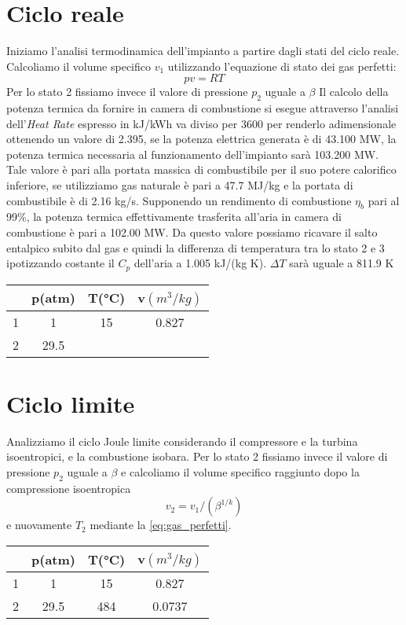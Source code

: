 \documentclass[a4paper,12pt]{article}
\begin{document}
\section{Ciclo reale}
\label{sec:ciclo_reale}
Iniziamo l'analisi termodinamica dell'impianto a partire dagli stati del ciclo reale.
Calcoliamo il volume specifico $v_1$ utilizzando l'equazione di stato dei gas perfetti:
\begin{equation}
    \label{eq:gas_perfetti}
    pv = RT
\end{equation}
Per lo stato 2 fissiamo invece il valore di pressione $p_2$ uguale a $\beta$
Il calcolo della potenza termica da fornire in camera di combustione si esegue attraverso l'analisi dell'\textit{Heat Rate} espresso in kJ/kWh va diviso per 3600 per renderlo
adimensionale ottenendo un valore di 2.395, se la potenza elettrica generata è di 43.100 MW, la potenza termica necessaria al funzionamento dell'impianto sarà 103.200 MW.
Tale valore è pari alla portata massica di combustibile per il suo potere calorifico inferiore, se utilizziamo gas naturale è pari a 47.7 MJ/kg e la portata di combustibile
è di 2.16 kg/s.
Supponendo un rendimento di combustione $\eta_b$ pari al 99\%, la potenza termica effettivamente trasferita all'aria in camera di combustione è pari a
102.00 MW. Da questo valore possiamo ricavare il salto entalpico subito dal gas e quindi la differenza di temperatura tra lo stato 2 e 3 ipotizzando costante il $C_p$
dell'aria a 1.005 kJ/(kg K).
$\Delta T$ sarà uguale a 811.9 K
\begin{center}
    \begin{tabular}{c|c|c|c}
            &p(atm) &T(°C)  &v$(m^3/kg)$     \\ \hline
        1   &    1  & 15    & 0.827   \\
        2   &   29.5&       &          \\
    \end{tabular}
\end{center}

\section{Ciclo limite}
\label{sec:ciclo_limite}
Analizziamo il ciclo Joule limite considerando il compressore e la turbina isoentropici, e la combustione isobara.
Per lo stato 2 fissiamo invece il valore di pressione $p_2$ uguale a $\beta$ e calcoliamo il volume specifico raggiunto dopo la compressione isoentropica
\begin{equation*}
    v_2 = v_1/(\beta^{1/k})
\end{equation*}
e nuovamente $T_2$ mediante la \eqref{eq:gas_perfetti}.
\begin{center}
    \begin{tabular}{c|c|c|c}
            &p(atm) &T(°C)  &v$(m^3/kg)$     \\ \hline
        1   &    1  & 15    & 0.827   \\
        2   &   29.5& 484   & 0.0737  \\
    \end{tabular}
\end{center}
\end{document}

